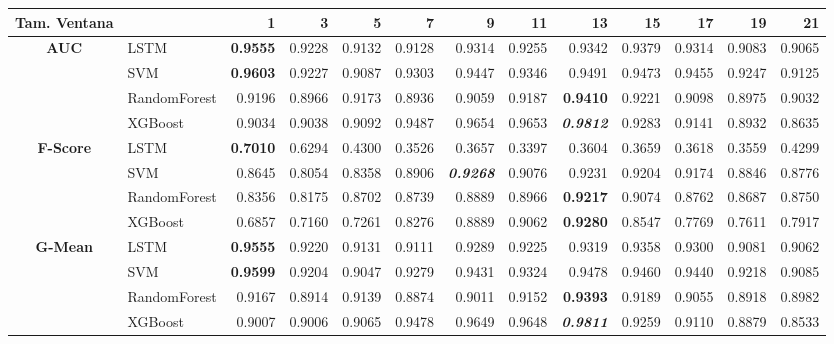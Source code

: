 \begin{table}[H]
	\centering
	\begin{adjustbox}{max width=14cm}
		\begin{tabular}{|c|l|r|r|r|r|r|r|r|r|r|r|r|}
			\hline
			\textbf{Tam. Ventana}&         &      1  &      3  &      5  &      7  &      9  &      11 &      13 &      15 &      17 &      19 &      21 \\
			\hline
			\textbf{AUC} & LSTM &  \textbf{0.9555} &  0.9228 &  0.9132 &  0.9128 &  0.9314 &  0.9255 &  0.9342 &  0.9379 &  0.9314 &  0.9083 &  0.9065 \\
			& SVM &  \textbf{0.9603} &  0.9227 &  0.9087 &  0.9303 &  0.9447 &  0.9346 &  0.9491 &  0.9473 &  0.9455 &  0.9247 &  0.9125 \\
			& RandomForest &  0.9196 &  0.8966 &  0.9173 &  0.8936 &  0.9059 &  0.9187 &  \textbf{0.9410} &  0.9221 &  0.9098 &  0.8975 &  0.9032 \\
			& XGBoost &  0.9034 &  0.9038 &  0.9092 &  0.9487 &  0.9654 &  0.9653 &  \textit{\textbf{0.9812}} &  0.9283 &  0.9141 &  0.8932 &  0.8635 \\
			\hline
			\textbf{F-Score} & LSTM &  \textbf{0.7010} &  0.6294 &  0.4300 &  0.3526 &  0.3657 &  0.3397 &  0.3604 &  0.3659 &  0.3618 &  0.3559 &  0.4299 \\
			& SVM &  0.8645 &  0.8054 &  0.8358 &  0.8906 &  \textit{\textbf{0.9268}} &  0.9076 &  0.9231 &  0.9204 &  0.9174 &  0.8846 &  0.8776 \\
			& RandomForest &  0.8356 &  0.8175 &  0.8702 &  0.8739 &  0.8889 &  0.8966 &  \textbf{0.9217} &  0.9074 &  0.8762 &  0.8687 &  0.8750 \\
			& XGBoost &  0.6857 &  0.7160 &  0.7261 &  0.8276 &  0.8889 &  0.9062 &  \textbf{0.9280} &  0.8547 &  0.7769 &  0.7611 &  0.7917 \\
			\hline
			\textbf{G-Mean} & LSTM &  \textbf{0.9555} &  0.9220 &  0.9131 &  0.9111 &  0.9289 &  0.9225 &  0.9319 &  0.9358 &  0.9300 &  0.9081 &  0.9062 \\
			& SVM &  \textbf{0.9599} &  0.9204 &  0.9047 &  0.9279 &  0.9431 &  0.9324 &  0.9478 &  0.9460 &  0.9440 &  0.9218 &  0.9085 \\
			& RandomForest &  0.9167 &  0.8914 &  0.9139 &  0.8874 &  0.9011 &  0.9152 &  \textbf{0.9393} &  0.9189 &  0.9055 &  0.8918 &  0.8982 \\
			& XGBoost &  0.9007 &  0.9006 &  0.9065 &  0.9478 &  0.9649 &  0.9648 &  \textit{\textbf{0.9811}}&  0.9259 &  0.9110 &  0.8879 &  0.8533 \\

\end{tabular}
\end{adjustbox}
\end{table}
